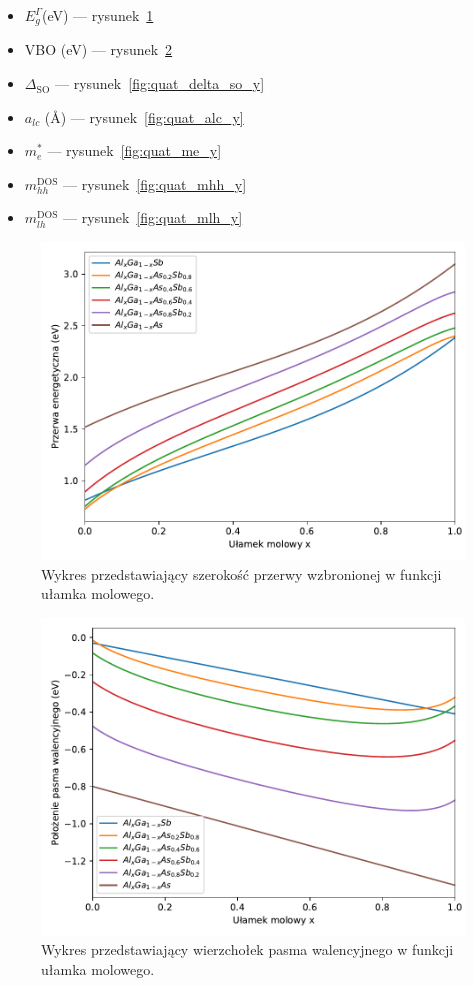 \documentclass[12pt,openany,a4paper]{book}
\begin{document}
\begin{itemize}
	\item \(E_g^{\Gamma}\)(eV) --- rysunek~\ref{fig:quat_Eg_y}
	\item VBO (eV) --- rysunek~\ref{fig:quat_vbo_y} 
	\item \(\Delta_{\textrm{SO}}\) --- rysunek~\ref{fig:quat_delta_so_y}
	\item \(a_{lc}\) (\AA) --- rysunek~\ref{fig:quat_alc_y}
	\item \(m_e^{\ast}\) --- rysunek~\ref{fig:quat_me_y}
	\item \(m_{hh}^{\textrm{DOS}}\) --- rysunek~\ref{fig:quat_mhh_y}
	\item \(m_{lh}^{\textrm{DOS}}\) --- rysunek~\ref{fig:quat_mlh_y}
\end{itemize}
\begin{figure}[H]
	\centering
	\includegraphics[width = 0.9\linewidth]{Figures/quaternary/quat_eg_y.pdf}
	\caption{Wykres przedstawiający szerokość przerwy wzbronionej w funkcji ułamka 
	molowego.}\label{fig:quat_Eg_y}
\end{figure}

\begin{figure}[H]
	\centering
	\includegraphics[width = 0.9\linewidth]{Figures/quaternary/quat_vbo_y.pdf}
	\caption{Wykres przedstawiający wierzchołek pasma walencyjnego w funkcji ułamka 
	molowego.}\label{fig:quat_vbo_y}
\end{figure}
\end{document}
